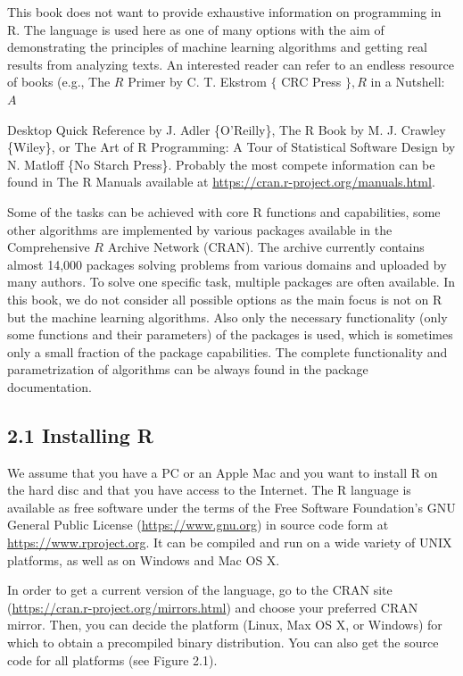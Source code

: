 \documentclass[10pt]{book}
\begin{document}
This book does not want to provide exhaustive information on programming in R. The language is used here as one of many options with the aim of demonstrating the principles of machine learning algorithms and getting real results from analyzing texts. An interested reader can refer to an endless resource of books (e.g., The $R$ Primer by C. T. Ekstrom $\{$ CRC Press $\}, R$ in a Nutshell: $A$

Desktop Quick Reference by J. Adler \{O'Reilly\}, The R Book by M. J. Crawley \{Wiley\}, or The Art of R Programming: A Tour of Statistical Software Design by N. Matloff \{No Starch Press\}. Probably the most compete information can be found in The R Manuals available at \href{https://cran.r-project.org/manuals.html}{https://cran.r-project.org/manuals.html}.

Some of the tasks can be achieved with core R functions and capabilities, some other algorithms are implemented by various packages available in the Comprehensive $R$ Archive Network (CRAN). The archive currently contains almost 14,000 packages solving problems from various domains and uploaded by many authors. To solve one specific task, multiple packages are often available. In this book, we do not consider all possible options as the main focus is not on R but the machine learning algorithms. Also only the necessary functionality (only some functions and their parameters) of the packages is used, which is sometimes only a small fraction of the package capabilities. The complete functionality and parametrization of algorithms can be always found in the package documentation.

\subsection*{2.1 Installing R}
We assume that you have a PC or an Apple Mac and you want to install R on the hard disc and that you have access to the Internet. The R language is available as free software under the terms of the Free Software Foundation's GNU General Public License (\href{https://www.gnu.org}{https://www.gnu.org}) in source code form at \href{https://www.rproject.org}{https://www.rproject.org}. It can be compiled and run on a wide variety of UNIX platforms, as well as on Windows and Mac OS X.

In order to get a current version of the language, go to the CRAN site (\href{https://cran.r-project.org/mirrors.html}{https://cran.r-project.org/mirrors.html}) and choose your preferred CRAN mirror. Then, you can decide the platform (Linux, Max OS X, or Windows) for which to obtain a precompiled binary distribution. You can also get the source code for all platforms (see Figure 2.1).
\end{document}
